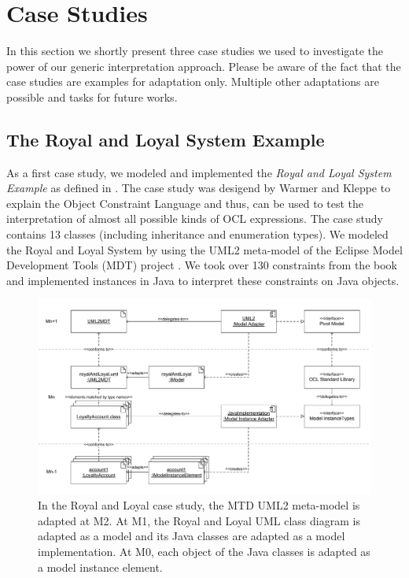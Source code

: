 \section{Case Studies}

In this section we shortly present three case studies we used to investigate the power of our generic interpretation approach. Please be aware of the fact that the case studies are examples for adaptation only. Multiple other adaptations are possible and tasks for future works.


\subsection{The Royal and Loyal System Example}

As a first case study, we modeled and implemented the \textit{Royal and Loyal System Example} as defined in \cite{warmer:ocl}. The case study was desigend by Warmer and Kleppe to explain the Object Constraint Language and thus, can be used to test the interpretation of almost all possible kinds of OCL expressions. The case study contains 13 classes (including inheritance and enumeration types). We modeled the Royal and Loyal System by using the UML2 meta-model of the Eclipse Model Development Tools (MDT) project \cite{WWW:MDT}. We took over 130 constraints from the book and implemented instances in Java to interpret these constraints on Java objects. 

\begin{figure}[tb]
	\centering
		\includegraphics[width=1.00\textwidth]{figures/casestudy01.pdf}
	\caption{In the Royal and Loyal case study, the MTD UML2 meta-model is adapted at M2. At M1, the Royal and Loyal UML class diagram is adapted as a model and its Java classes are adapted as a model implementation. At M0, each object of the Java classes is adapted as a model instance element.}
	\label{fig:casestudy01}
\end{figure}

